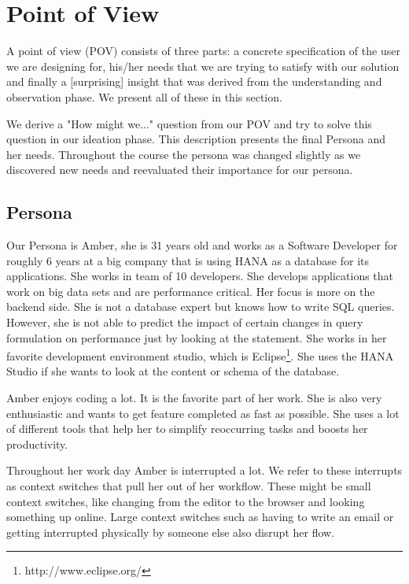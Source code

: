 
\section{Point of View} \label{sec:POINT_OF_VIEW}

A point of view (POV) consists of three parts: a concrete specification of the user we are designing for, his/her needs that we are trying to satisfy with our solution and finally a [surprising] insight that was derived from the understanding and observation phase. We present all of these in this section.

We derive a "How might we..." question from our POV and try to solve this question in our ideation phase. This description presents the final Persona and her needs. Throughout the course the persona was changed slightly as we discovered new needs and reevaluated their importance for our persona. 

\subsection{Persona}
\label{subsec:persona}

Our Persona is Amber, she is 31 years old and works as a Software Developer for roughly 6 years at a big company that is using HANA as a database for its applications. She works in team of 10 developers. She develops applications that work on big data sets and are performance critical. Her focus is more on the backend side. She is not a database expert but knows how to write SQL queries. However, she is not able to predict the impact of certain changes in query formulation on performance just by looking at the statement. She works in her favorite development environment studio, which is Eclipse\footnote{http://www.eclipse.org/}. She uses the HANA Studio if she wants to look at the content or schema of the database.

Amber enjoys coding a lot. It is the favorite part of her work. She is also very enthusiastic and wants to get feature completed as fast as possible. She uses a lot of different tools that help her to simplify reoccurring tasks and boosts her productivity.

Throughout her work day Amber is interrupted a lot. We refer to these interrupts as context switches that pull her out of her workflow. These might be small context switches, like changing from the editor to the browser and looking something up online. Large context switches such as having to write an email or getting interrupted physically by someone else also disrupt her flow.

